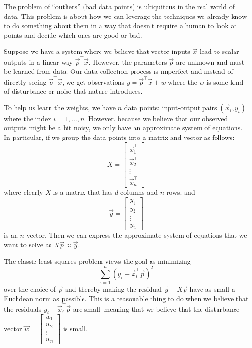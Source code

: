 
The problem of ``outliers'' (bad data points) is ubiquitous in the
real world of data. This problem is about how we can leverage the
techniques we already know to do something about them in a way that
doesn't require a human to look at points and decide which ones are
good or bad. 

Suppose we have a system where we believe that vector-inputs $\vec{x}$ lead
to scalar outputs in a linear way $\vec{p}^\top \vec{x}$. However, the
parameters $\vec{p}$ are unknown and must be learned from data. Our
data collection process is imperfect and instead of directly seeing 
$\vec{p}^\top \vec{x}$, we get observations $y = \vec{p}^\top \vec{x} + w$
where the $w$ is some kind of disturbance or noise that nature introduces.

To help us learn the weights, we have $n$ data points: input-output
pairs $(\vec{x}_i, y_i)$ where the index $i = 1, \ldots, n$. However,
because we believe that our observed outputs might be a bit noisy, we
only have an approximate system of equations. In particular, if we
group the data points into a matrix and vector as follows: 
$$
X = \begin{bmatrix} \vec{x}_1^\top \\ \vec{x}_2^\top \\ \vdots \\
  \vec{x}_n^\top 
\end{bmatrix}
$$ 
where clearly $X$ is a matrix that has $d$ columns and $n$ rows. and 
$$
\vec{y} = \begin{bmatrix} y_1 \\ y_2 \\ \vdots \\  y_n 
\end{bmatrix}
$$ 
is an $n$-vector. Then we can express the approximate system of equations that we want
to solve as $X \vec{p} \approx \vec{y}$. 

The classic least-squares problem views the goal as minimizing 
\begin{equation} \label{eqn:outlier-sum}
  \sum_{i=1}^n (y_i - \vec{x}_i^\top \vec{p})^2
\end{equation}
over the choice of $\vec{p}$ and thereby making the residual $\vec{y}
- X \vec{p}$ have as small a Euclidean norm as possible.  This is a
reasonable thing to do when we believe that the residuals $y_i -
\vec{x}_i^\top \vec{p}$ are small, meaning that we believe that the
disturbance vector $\vec{w} = \begin{bmatrix} w_1 \\ w_2 \\ \vdots \\
  w_n
\end{bmatrix}$ is small. 

